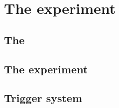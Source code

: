 \chapter{The \CMS experiment}
\label{chap:detector}


\section{The \LHC}


\section{The \CMS experiment}
\label{sec:CMSInDetail}


\section{Trigger system}
\label{sec:triggers}
